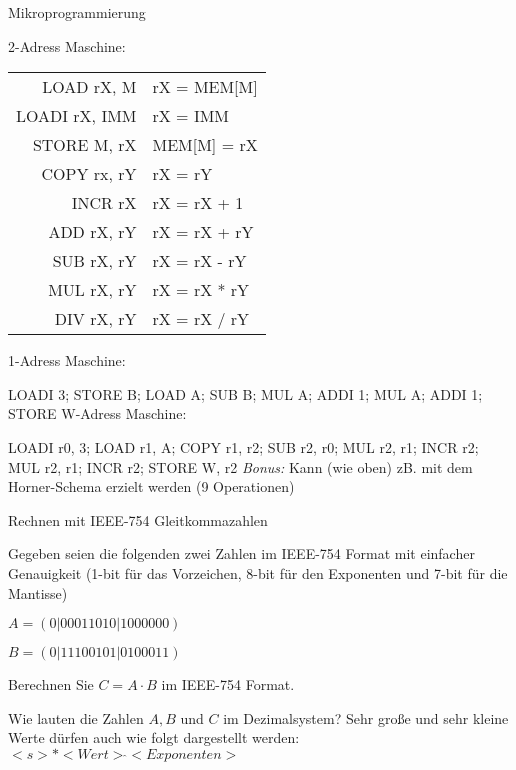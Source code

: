 \documentclass{exercisesheet}
\begin{document}
\begin{exercise}{Mikroprogrammierung}
\begin{multicols}{2}
    2-Adress Maschine:\par
    \begin{tabular}{|r|l|}
      \hline
      LOAD rX, M    & rX = MEM[M]  \\
      LOADI rX, IMM & rX = IMM     \\
      STORE M, rX   & MEM[M] = rX  \\
      COPY rx, rY   & rX = rY      \\
      INCR rX       & rX = rX + 1  \\
      ADD rX, rY    & rX = rX + rY \\
      SUB rX, rY    & rX = rX - rY \\
      MUL rX, rY    & rX = rX * rY \\
      DIV rX, rY    & rX = rX / rY \\
      \hline
    \end{tabular}
  \end{multicols}

  \begin{solution}
    1-Adress Maschine:\par LOADI 3; STORE B; LOAD A; SUB B; MUL A; ADDI 1; MUL A; ADDI 1; STORE W-Adress Maschine:\par LOADI r0, 3; LOAD r1, A; COPY r1, r2; SUB r2, r0; MUL r2, r1; INCR r2; MUL r2, r1; INCR r2; STORE W, r2\newline
    \textit{Bonus:} Kann (wie oben) zB. mit dem Horner-Schema erzielt werden (9 Operationen)
  \end{solution}
\end{exercise}

\begin{eexercises}[4]{Rechnen mit IEEE-754 Gleitkommazahlen}{
    Gegeben seien die folgenden zwei Zahlen im IEEE-754 Format mit einfacher Genauigkeit (1-bit für das Vorzeichen, 8-bit für den Exponenten und 7-bit für die Mantisse)\par
    \centering $A = (0|00011010|1000000)$\par $B = (0|11100101|0100011)$
  }
  \item Berechnen Sie $C = A \cdot B$ im IEEE-754 Format.
  \item Wie lauten die Zahlen $A, B$ und $C$ im Dezimalsystem? Sehr große und sehr kleine Werte dürfen auch wie folgt dargestellt werden: $<s>*<Wert> \hat{} <Exponenten>$
\end{eexercises}
\end{document}

